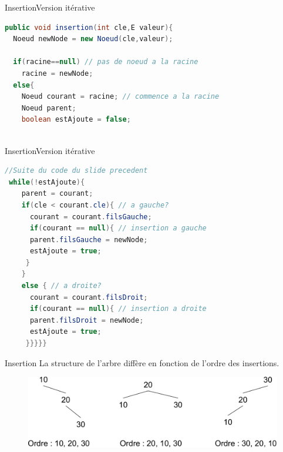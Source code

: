 \documentclass[12pt,a4paper]{beamer}
\begin{document}
\begin{frame}[fragile]{Insertion}{Version itérative}
\begin{lstlisting}[language=Java]
public void insertion(int cle,E valeur){
  Noeud newNode = new Noeud(cle,valeur);

  if(racine==null) // pas de noeud a la racine
    racine = newNode;
  else{
    Noeud courant = racine; // commence a la racine
    Noeud parent;
    boolean estAjoute = false;
    
\end{lstlisting}
\end{frame}

\begin{frame}[fragile]{Insertion}{Version itérative}
\begin{lstlisting}[language=Java]
//Suite du code du slide precedent
 while(!estAjoute){
    parent = courant;
    if(cle < courant.cle){ // a gauche?
      courant = courant.filsGauche;
      if(courant == null){ // insertion a gauche
      parent.filsGauche = newNode;
      estAjoute = true;
     }
    }
    else { // a droite?
      courant = courant.filsDroit;
      if(courant == null){ // insertion a droite
      parent.filsDroit = newNode;
      estAjoute = true;
     }}}}}
\end{lstlisting}
\end{frame}

\begin{frame}{Insertion}
La structure de l'arbre diffère en fonction de l'ordre des insertions.
\begin{figure}
\includegraphics[scale=0.5]{figs/tree_insert}
\end{figure}
\end{frame}
\end{document}
